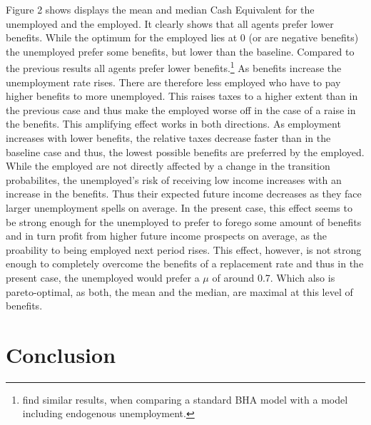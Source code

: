 \documentclass[a4paper,12pt]{article}
\begin{document}
Figure 2 shows displays the mean and median Cash Equivalent for the unemployed and the employed. It clearly shows that all agents prefer lower benefits. While the optimum for the employed lies at 0 (or are negative benefits) the unemployed prefer some benefits, but lower than the baseline. 
Compared to the previous results all agents prefer lower benefits.\footnote{\cite{KrusellMukoyamaSahin} find similar results, when comparing a standard BHA model with a model including endogenous unemployment.} 
As benefits increase the unemployment rate rises. There are therefore less employed who have to pay higher benefits to more unemployed. This raises taxes to a higher extent than in the previous case and thus make the employed worse off in the case of a raise in the benefits. This amplifying effect works in both directions. As employment increases with lower benefits, the relative taxes decrease faster than in the baseline case and thus, the lowest possible benefits are preferred by the employed. 
While the employed are not directly affected by a change in the transition probabilites, the unemployed's risk of receiving low income increases with an increase in the benefits. Thus their expected future income decreases as they face larger unemployment spells on average. In the present case, this effect seems to be strong enough for the unemployed to prefer to forego some amount of benefits and in turn profit from higher future income prospects on average, as the proability to being employed next period rises. This effect, however, is not strong enough to completely overcome the benefits of a replacement rate and thus in the present case, the unemployed would prefer a $\mu$ of around 0.7. Which also is pareto-optimal, as both, the mean and the median, are maximal at this level of benefits. 

\section{Conclusion}
\end{document}
